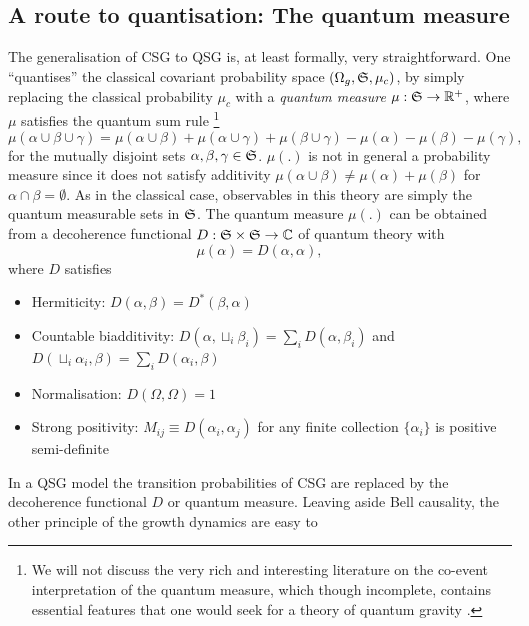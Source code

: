 \subsection{A route to quantisation: The quantum measure} 
\label{ssec:qsg} 

The generalisation of CSG to QSG  is,  at least formally, very  straightforward. One ``quantises'' 
the  classical covariant probability space $(\Omega_g, \mathfrak S, \mu_c)$, by simply replacing the classical probability $\mu_c$
with a \emph{quantum measure}  $\mu: \mathfrak S \rightarrow \mathbb R^+$, where $\mu$ satisfies the quantum sum rule \citep{qmeasureone,qmeasuretwo,salgadoqm,sorkinqmeasure}\footnote{We will not discuss the very rich and interesting literature on the co-event interpretation of  the quantum measure, which though incomplete, contains essential features that one would seek for a theory of quantum
  gravity \citep{coevents}.}  
\begin{equation}
\mu(\alpha \cup \beta \cup \gamma) = \mu(\alpha \cup \beta) + \mu(\alpha \cup \gamma) + \mu(\beta \cup \gamma) - \mu(\alpha) -\mu(\beta) -\mu(\gamma),   
\end{equation}
for the mutually disjoint sets $\alpha,\beta,\gamma \in \mathfrak S$. $\mu(.)$ is not in general a probability measure since it
does not satisfy additivity $ \mu(\alpha \cup \beta) \neq \mu(\alpha) + \mu(\beta)$ for  $\alpha \cap \beta =\emptyset$.
As in the classical case, observables in this theory are simply the quantum measurable sets in
$\mathfrak S$.  
The quantum measure $\mu(.)$  can be obtained from  a  decoherence  functional $D: \mathfrak S \times \mathfrak S \rightarrow \mathbb C$ of quantum theory
with 
\begin{equation}
\mu(\alpha) = D(\alpha,\alpha), 
\end{equation} 
where $D$ satisfies 
\begin{itemize}
\item Hermiticity:  $D(\alpha,\beta)=D^*(\beta,\alpha)$ 
\item  Countable  biadditivity: $D(\alpha, \sqcup_i \beta_i)=\sum_i D(\alpha, \beta_i)$ and $D(\sqcup_i\alpha_i,
  \beta)=\sum_i D(\alpha_i, \beta)$  
\item Normalisation: $D(\Omega,\Omega)=1$ 
\item Strong
  positivity: $M_{ij}\equiv D(\alpha_i, \alpha_j)$ for any finite collection $\{\alpha_i\} $ is positive semi-definite
\end{itemize}
In a QSG model the transition probabilities of CSG are replaced by the decoherence functional
  $D$ or quantum measure.  Leaving aside Bell causality, the other principle of the growth dynamics are easy to

